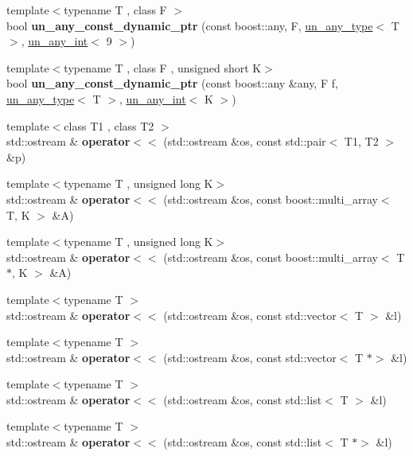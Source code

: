 \begin{DoxyCompactItemize}
\item 
{\footnotesize template$<$typename T , class F $>$ }\\bool {\bfseries un\+\_\+any\+\_\+const\+\_\+dynamic\+\_\+ptr} (const boost\+::any, F, \mbox{\hyperlink{struct_s_m_spp__di__unipi__it_1_1un__any__type}{un\+\_\+any\+\_\+type}}$<$ T $>$, \mbox{\hyperlink{struct_s_m_spp__di__unipi__it_1_1un__any__int}{un\+\_\+any\+\_\+int}}$<$ 9 $>$)
\item 
{\footnotesize template$<$typename T , class F , unsigned short K$>$ }\\bool {\bfseries un\+\_\+any\+\_\+const\+\_\+dynamic\+\_\+ptr} (const boost\+::any \&any, F f, \mbox{\hyperlink{struct_s_m_spp__di__unipi__it_1_1un__any__type}{un\+\_\+any\+\_\+type}}$<$ T $>$, \mbox{\hyperlink{struct_s_m_spp__di__unipi__it_1_1un__any__int}{un\+\_\+any\+\_\+int}}$<$ K $>$)
\item 
{\footnotesize template$<$class T1 , class T2 $>$ }\\std\+::ostream \& {\bfseries operator$<$$<$} (std\+::ostream \&os, const std\+::pair$<$ T1, T2 $>$ \&p)
\item 
{\footnotesize template$<$typename T , unsigned long K$>$ }\\std\+::ostream \& {\bfseries operator$<$$<$} (std\+::ostream \&os, const boost\+::multi\+\_\+array$<$ T, K $>$ \&A)
\item 
{\footnotesize template$<$typename T , unsigned long K$>$ }\\std\+::ostream \& {\bfseries operator$<$$<$} (std\+::ostream \&os, const boost\+::multi\+\_\+array$<$ T $\ast$, K $>$ \&A)
\item 
{\footnotesize template$<$typename T $>$ }\\std\+::ostream \& {\bfseries operator$<$$<$} (std\+::ostream \&os, const std\+::vector$<$ T $>$ \&l)
\item 
{\footnotesize template$<$typename T $>$ }\\std\+::ostream \& {\bfseries operator$<$$<$} (std\+::ostream \&os, const std\+::vector$<$ T $\ast$$>$ \&l)
\item 
{\footnotesize template$<$typename T $>$ }\\std\+::ostream \& {\bfseries operator$<$$<$} (std\+::ostream \&os, const std\+::list$<$ T $>$ \&l)
\item 
{\footnotesize template$<$typename T $>$ }\\std\+::ostream \& {\bfseries operator$<$$<$} (std\+::ostream \&os, const std\+::list$<$ T $\ast$$>$ \&l)
\item 

\end{DoxyCompactItemize}
